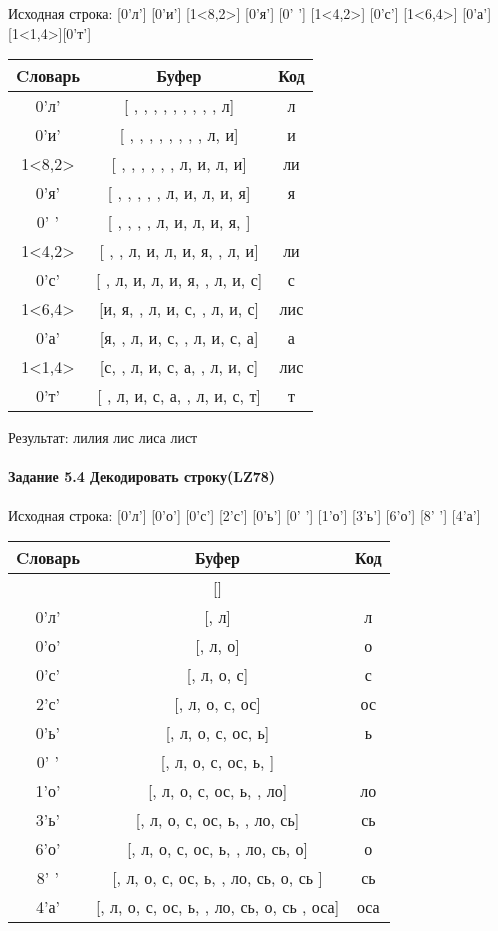 \documentclass[a4paper, 12pt]{article}
\begin{document}
Исходная строка: [0'л'] [0'и'] [1<8,2>] [0'я'] [0' '] [1<4,2>] [0'с'] [1<6,4>] [0'а'] [1<1,4>][0'т']\\
\begin{table}[h!]
\centering
\begin{tabular}{|c|c|c|}
\hline
 Cловарь & Буфер & Код  \\ \hline
0'л' & [ ,  ,  ,  ,  ,  ,  ,  ,  , л] & л
\\ \hline
0'и' & [ ,  ,  ,  ,  ,  ,  ,  , л, и] & и
\\ \hline
1<8,2> & [ ,  ,  ,  ,  ,  , л, и, л, и] & ли
\\ \hline
0'я' & [ ,  ,  ,  ,  , л, и, л, и, я] & я
\\ \hline
0' ' & [ ,  ,  ,  , л, и, л, и, я,  ] &  
\\ \hline
1<4,2> & [ ,  , л, и, л, и, я,  , л, и] & ли
\\ \hline
0'с' & [ , л, и, л, и, я,  , л, и, с] & с
\\ \hline
1<6,4> & [и, я,  , л, и, с,  , л, и, с] &  лис
\\ \hline
0'а' & [я,  , л, и, с,  , л, и, с, а] & а
\\ \hline
1<1,4> & [с,  , л, и, с, а,  , л, и, с] &  лис
\\ \hline
0'т' & [ , л, и, с, а,  , л, и, с, т] & т
\\ \hline
\end{tabular}
\end{table}

Результат: лилия лис лиса лист
\pagebreak
\paragraph{Задание 5.4 Декодировать строку(LZ78)\\}

Исходная строка: [0'л'] [0'о'] [0'с'] [2'с'] [0'ь'] [0' '] [1'о'] [3'ь'] [6'о'] [8' '] [4'а']\\
\begin{table}[h!]
\centering
\begin{tabular}{|c|c|c|}
\hline
 Cловарь & Буфер & Код  \\ \hline
 & [] & 
\\ \hline
0'л' & [, л] & л
\\ \hline
0'о' & [, л, о] & о
\\ \hline
0'с' & [, л, о, с] & с
\\ \hline
2'с' & [, л, о, с, ос] & ос
\\ \hline
0'ь' & [, л, о, с, ос, ь] & ь
\\ \hline
0' ' & [, л, о, с, ос, ь,  ] &  
\\ \hline
1'о' & [, л, о, с, ос, ь,  , ло] & ло
\\ \hline
3'ь' & [, л, о, с, ос, ь,  , ло, сь] & сь
\\ \hline
6'о' & [, л, о, с, ос, ь,  , ло, сь,  о] &  о
\\ \hline
8' ' & [, л, о, с, ос, ь,  , ло, сь,  о, сь ] & сь 
\\ \hline
4'а' & [, л, о, с, ос, ь,  , ло, сь,  о, сь , оса] & оса
\\ \hline
\end{tabular}
\end{table}
\end{document}
